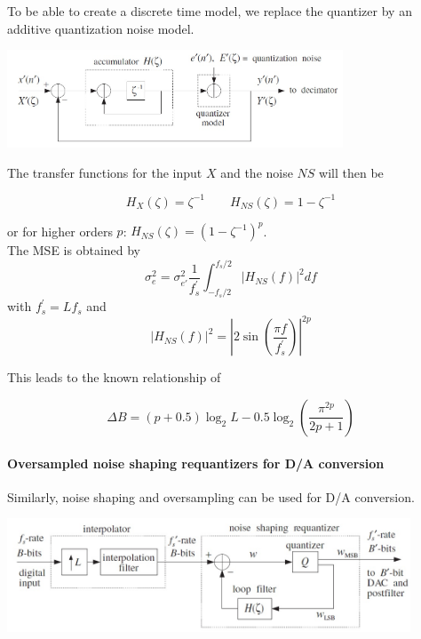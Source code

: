 To be able to create a discrete time model, we replace the quantizer by
an additive quantization noise model.

\begin{center}
	\includegraphics[width=10cm]{images/IntDecOv_SigmaDeltaModel.jpg}
\end{center}

The transfer functions for the input $X$ and the noise $NS$ will then be

\begin{equation*}
	H_X(\zeta) = \zeta^{-1} \qquad H_{NS}(\zeta) = 1 - \zeta^{-1}
\end{equation*}

or for higher orders $p$: $H_{NS}(\zeta) = (1-\zeta^{-1})^p$. \\

The MSE is obtained by
\begin{equation*}
  \sigma_e^2 = \sigma_{e'}^2 \frac{1}{f_s^{'}} \int_{-f_s/2}^{f_s/2} |H_{NS}(f)|^2 df
\end{equation*}
with $f_s^{'} = L f_s$ and
\begin{equation*}
  |H_{NS}(f)|^2 = |2 \sin(\frac{\pi f}{f_s^{'}})|^{2p}
\end{equation*}

This leads to the known relationship of

\begin{equation*}
	\Delta B = (p+0.5) \log_2 L - 0.5 \log_2\left(\frac{\pi^{2p}}{2p+1}\right)
\end{equation*}


\paragraph{Oversampled noise shaping requantizers for D/A conversion}
Similarly, noise shaping and oversampling can be used for D/A conversion.

\begin{center}
	\includegraphics[width=12cm]{images/IntDecOv_Requantizer.jpg}
\end{center}

